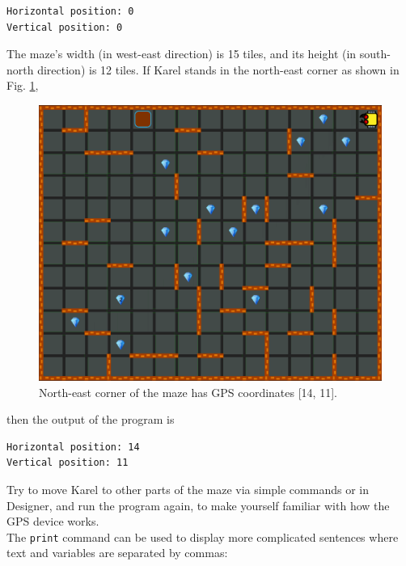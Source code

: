 \begin{ybox}
\begin{verbatim}
Horizontal position: 0
Vertical position: 0
\end{verbatim}
\end{ybox}
\vspace{6mm}

\noindent
The maze's width (in west-east direction) is 15 tiles, and its height (in south-north direction) 
is 12 tiles. If Karel stands in the north-east corner as shown in Fig. \ref{fig:gps-101},

\begin{figure}[!ht]
\begin{center}
\includegraphics[height=0.4\textwidth]{img/gps-101.png}
\vspace{-0mm}
\caption{North-east corner of the maze has GPS coordinates [14, 11].}
\label{fig:gps-101}
\end{center}
\end{figure}

\noindent
then the output of the program is\\

\begin{ybox}
\begin{verbatim}
Horizontal position: 14
Vertical position: 11
\end{verbatim}
\end{ybox}
\vspace{6mm}

\noindent
Try to move Karel to other parts of the maze via simple commands or in Designer, 
and run the program again, to make yourself familiar with how the GPS device works.\\

\noindent
The {\tt print} command can be used to display more complicated sentences where text
and variables are separated by commas:\\

